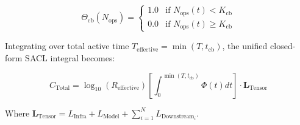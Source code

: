 \begin{equation}
\Theta_{\text{cb}}(N_{\text{ops}}) = \begin{cases} 
1.0 & \text{if } N_{\text{ops}}(t) < K_{\text{cb}} \\
0.0 & \text{if } N_{\text{ops}}(t) \ge K_{\text{cb}} 
\end{cases}
\end{equation}

Integrating over total active time $T_{\text{effective}} = \min(T, t_{\text{cb}})$, the unified closed-form SACL integral becomes:

\begin{equation}
C_{\text{Total}} = \log_{10}(R_{\text{effective}}) \left[ \int_{0}^{\min(T, t_{\text{cb}})} \Phi(t) dt \right] \cdot \mathbf{L}_{\text{Tensor}}
\label{eq:sacl_closed}
\end{equation}

Where $\mathbf{L}_{\text{Tensor}} = L_{\text{Infra}} + L_{\text{Model}} + \sum_{i=1}^{N} L_{\text{Downstream}_i}$.
